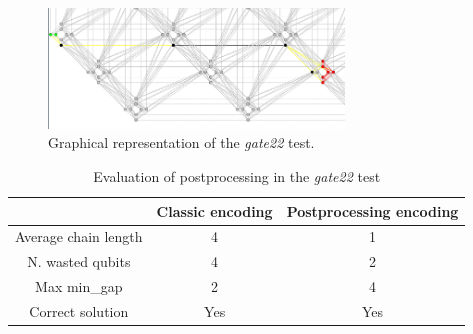 \begin{figure}[!hbt]
    \centering
    \includegraphics[width=0.7\textwidth]{images/gate22.PNG}
    \caption{Graphical representation of the \textit{gate22} test.}
    \label{fig:my_label}
\end{figure}

\begin{table}[!hbt]
\centering
\begin{tabular}{|c|c|c|}
\hline
 & \cellcolor[HTML]{FFFE65}Classic encoding & \cellcolor[HTML]{FFFE65}Postprocessing encoding \\ \hline
\cellcolor[HTML]{00D2CB}Average chain length & 4 & 1 \\ \hline
\cellcolor[HTML]{00D2CB}N. wasted qubits & 4 & 2 \\ \hline
\cellcolor[HTML]{00D2CB}Max min\_gap & 2 & 4 \\ \hline
\rowcolor[HTML]{67FD9A} 
\cellcolor[HTML]{00D2CB}Correct solution     & Yes                                      & Yes                                             \\ \hline
\end{tabular}
\caption{Evaluation of postprocessing in the \textit{gate22} test}
\end{table}



\newpage

